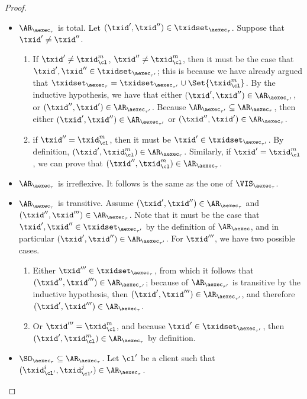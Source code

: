 \begin{proof}
\begin{itemize}
\begin{itemize}
\item $\AR_{\aexec_{\tau}}$ is total. Let $(\txid', \txid'') \in \txidset_{\aexec_{\tau}}$. 
Suppose that $\txid' \neq \txid''$.
\begin{enumerate}
\item If $\txid' \neq 
\txid_{\cl}^{m}$, $\txid'' \neq \txid_{\cl}^{m}$, then it must be the case that $\txid', \txid'' \in \txidset_{\aexec_{\tau'}}$; 
this is because we have already argued that $\txidset_{\aexec_{\tau}} = \txidset_{\aexec_{\tau'}} \cup \Set{\txid_{\cl}^{m}}$. 
By the inductive hypothesis, we have that either $(\txid', \txid'') \in \AR_{\aexec_{\tau'}}$, or 
$(\txid'', \txid') \in \AR_{\aexec_{\tau'}}$. Because $\AR_{\aexec_{\tau'}} \subseteq \AR_{\aexec_{\tau}}$, 
then either $(\txid', \txid'') \in \AR_{\aexec_{\tau'}}$ or $(\txid'', \txid') \in \AR_{\aexec_{\tau}}$. 
\item if $\txid'' = \txid_{\cl}^{m}$, then it must be $\txid' \in \txidset_{\aexec_{\tau'}}$. By definition, 
$(\txid', \txid_{\cl}^{m}) \in \AR_{\aexec_{\tau}}$. Similarly, if $\txid' = \txid_{\cl}^{m}$, we 
can prove that $(\txid'', \txid_{\cl}^{m}) \in \AR_{\aexec_{\tau}}$.
\end{enumerate}
\item  $\AR_{\aexec_{\tau}}$ is irreflexive. It follows is the same as the one of $\VIS_{\aexec_{\tau}}$.
\item \( \AR_{\aexec_{\tau}} \) is transitive.
Assume $(\txid', \txid'') \in \AR_{\aexec_{\tau}}$ and $(\txid'', \txid''') \in \AR_{\aexec_{\tau}}$. 
Note that it must be the case that $\txid', \txid'' \in \txidset_{\aexec_{\tau'}}$ by the definition of 
$\AR_{\aexec}$, and in particular $(\txid', \txid'') \in \AR_{\aexec_{\tau'}}$. 
For $\txid'''$, we have two possible cases. 
\begin{enumerate}
\item Either $\txid''' \in \txidset_{\aexec_{\tau}}$, from 
which it follows that $(\txid'', \txid''') \in \AR_{\aexec_{\tau'}}$; because
of $\AR_{\aexec_{\tau'}}$ is transitive by the inductive hypothesis, then 
$(\txid', \txid''') \in \AR_{\aexec_{\tau'}}$, and therefore $(\txid' ,\txid''') \in 
\AR_{\aexec_{\tau}}$.
\item Or $\txid''' = \txid_{\cl}^{m}$, and because $\txid' \in \txidset_{\aexec_{\tau'}}$, then 
$(\txid', \txid_{\cl}^{m}) \in \AR_{\aexec_{\tau}}$ by definition. 
\end{enumerate}
\item \( \SO_{\aexec_{\tau}} \subseteq \AR_{\aexec_{\tau}} \).
Let $\cl'$ be a client such that $(\txid_{\cl'}^{i}, \txid_{\cl'}^{j}) \in \AR_{\aexec_{\tau}}$. 

\end{itemize}
\end{itemize}
\end{proof}

